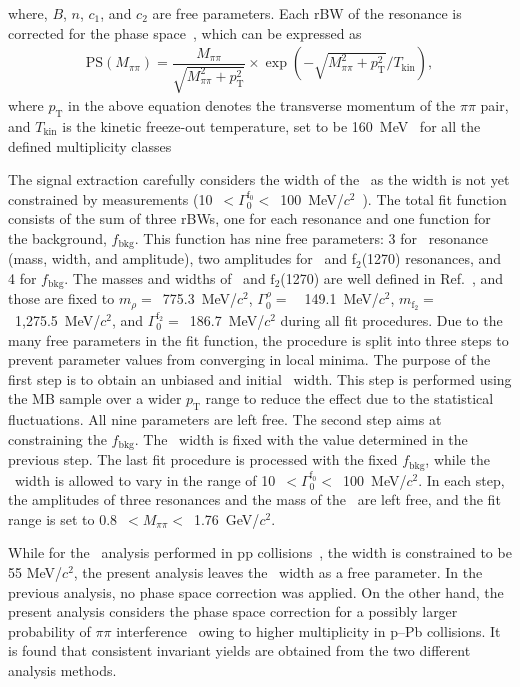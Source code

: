 where, $B$, $n$, $c_{1}$, and $c_{2}$ are free parameters. Each rBW of the resonance is corrected for the phase space~\cite{ALICE:2018qdv}, which can be expressed as
\begin{eqnarray}
\mathrm{PS}(M_{\pi\pi}) = \dfrac{M_{\pi\pi}}{\sqrt{M_{\pi\pi}^{2}+p_{\mathrm{T}}^{2}}}\times\exp{(-\sqrt{M_{\pi\pi}^{2}+p_{\mathrm{T}}^{2}}/T_{\mathrm{kin}})},
\label{eq:ps}
\end{eqnarray} 
where $p_{\mathrm{T}}$ in the above equation denotes the transverse momentum of the $\pi\pi$ pair, and $T_{\mathrm{kin}}$ is the kinetic freeze-out temperature, set to be 160~MeV~\cite{ALICE:2018qdv} for all the defined multiplicity classes

The signal extraction carefully considers the width of the \fzero~as the width is not yet constrained by measurements (10~$<\Gamma_{0}^{\mathrm{f}_{0}}<$~100~MeV/$c^{2}$~\cite{ParticleDataGroup:2022pth}). The total fit function consists of the sum of three rBWs, one for each resonance and one function for the background, $f_{\mathrm{bkg}}$. This function has nine free parameters: 3 for \fzero~resonance (mass, width, and amplitude), two amplitudes for \rhoz~and f$_{2}$(1270) resonances, and 4 for $f_{\mathrm{bkg}}$. The masses and widths of \rhoz~and $\mathrm{f}_{2}$(1270) are well defined in Ref.~\cite{ParticleDataGroup:2022pth}, and those are fixed to $m_{\rho}=$~775.3~MeV/$c^{2}$, $\Gamma^{\rho}_{0}=$~~149.1~MeV/$c^{2}$, $m_{\mathrm{f}_{2}}=$~1,275.5~MeV/$c^{2}$, and $\Gamma^{\mathrm{f}_{2}}_{0}=$~186.7~MeV/$c^{2}$ during all fit procedures. Due to the many free parameters in the fit function, the procedure is split into three steps to prevent parameter values from converging in local minima. The purpose of the first step is to obtain an unbiased and initial \fzero~width. This step is performed using the MB sample over a wider $p_{\mathrm{T}}$ range to reduce the effect due to the statistical fluctuations. All nine parameters are left free. The second step aims at constraining the $f_{\mathrm{bkg}}$. The \fzero~width is fixed with the value determined in the previous step. The last fit procedure is processed with the fixed $f_{\mathrm{bkg}}$, while the \fzero~width is allowed to vary in the range of 10~$<\Gamma_{0}^{\mathrm{f}_{0}}<$~100~MeV/$c^{2}$. In each step, the amplitudes of three resonances and the mass of the \fzero~are left free, and the fit range is set to 0.8~$<M_{\pi\pi}<$~1.76~GeV/$c^{2}$.


While for the \fzero~analysis performed in pp collisions~\cite{ALICE:2022qnb}, the width is constrained to be 55 MeV/$c^{2}$, the present analysis leaves the \fzero~width as a free parameter. In the previous analysis, no phase space correction was applied. On the other hand, the present analysis considers the phase space correction for a possibly larger probability of $\pi\pi$ interference~\cite{STAR:2003vqj} owing to higher multiplicity in p--Pb collisions. It is found that consistent invariant yields are obtained from the two different analysis methods.

